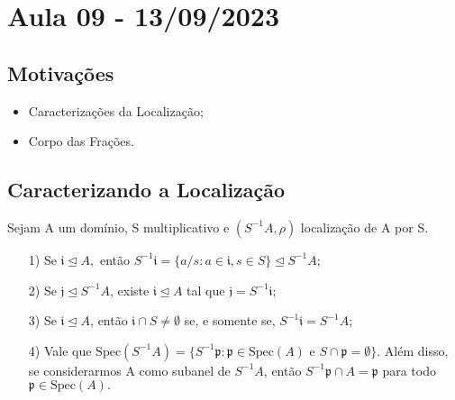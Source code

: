 \documentclass[algebraII_notes.tex]{subfiles}
\begin{document}
\section{Aula 09 - 13/09/2023}
\subsection{Motivações}
\begin{itemize}
	\item Caracterizações da Localização;
	\item Corpo das Frações.
\end{itemize}
\subsection{Caracterizando a Localização}
\begin{prop*}
	Sejam A um domínio, S multiplicativo e \((S^{-1}A, \rho )\) localização de A por S.
	\begin{itemize}
		\item[1)] Se \(\mathfrak{i}\trianglelefteq{A},\) então \(S^{-1}\mathfrak{i} = \{a/s: a\in \mathfrak{i}, s\in S\}\trianglelefteq{S^{-1}A};\)
		\item[2)] Se \(\mathfrak{j}\trianglelefteq{S^{-1}A}\), existe \(\mathfrak{i}\trianglelefteq{A}\) tal que \(\mathfrak{j} = S^{-1}\mathfrak{i};\)
		\item[3)] Se \(\mathfrak{i}\trianglelefteq{A}\), então \(\mathfrak{i}\cap S \neq\emptyset\) se, e somente se, \(S^{-1}\mathfrak{i} = S^{-1}A;\)
		\item[4)] Vale que \(\mathrm{Spec}(S^{-1}A) = \{S^{-1}\mathfrak{p}:\mathfrak{p}\in \mathrm{Spec}(A) \text{ e } S\cap \mathfrak{p}=\emptyset\}\). Além disso, se considerarmos A como subanel de \(S^{-1}A\),
		      então \(S^{-1}\mathfrak{p}\cap A = \mathfrak{p}\) para todo \(\mathfrak{p}\in \mathrm{Spec}(A).\)
	\end{itemize}
\end{prop*}
\end{document}
